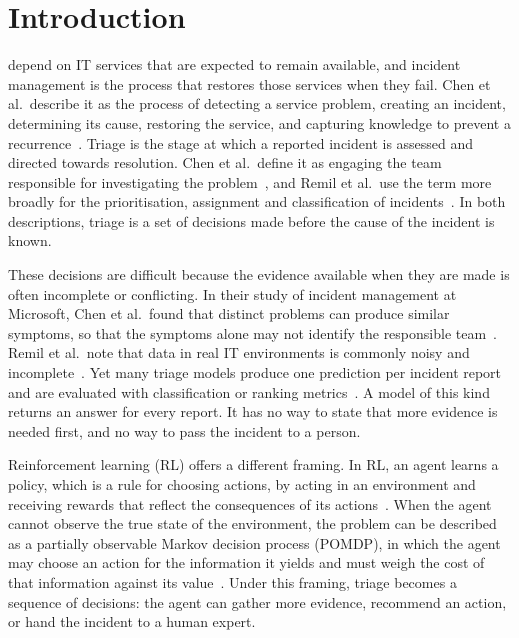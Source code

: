 \documentclass[journal]{IEEEtran}
\begin{document}
\section{Introduction}

 depend on IT services that are expected to remain available, and incident management is the process that restores those services when they fail. Chen et al.\ describe it as the process of detecting a service problem, creating an incident, determining its cause, restoring the service, and capturing knowledge to prevent a recurrence~\cite{chen2020}. Triage is the stage at which a reported incident is assessed and directed towards resolution. Chen et al.\ define it as engaging the team responsible for investigating the problem~\cite{chen2020}, and Remil et al.\ use the term more broadly for the prioritisation, assignment and classification of incidents~\cite{remil2024}. In both descriptions, triage is a set of decisions made before the cause of the incident is known.

These decisions are difficult because the evidence available when they are made is often incomplete or conflicting. In their study of incident management at Microsoft, Chen et al.\ found that distinct problems can produce similar symptoms, so that the symptoms alone may not identify the responsible team~\cite{chen2020}. Remil et al.\ note that data in real IT environments is commonly noisy and incomplete~\cite{remil2024}. Yet many triage models produce one prediction per incident report and are evaluated with classification or ranking metrics~\cite{remil2024}. A model of this kind returns an answer for every report. It has no way to state that more evidence is needed first, and no way to pass the incident to a person.

Reinforcement learning (RL) offers a different framing. In RL, an agent learns a policy, which is a rule for choosing actions, by acting in an environment and receiving rewards that reflect the consequences of its actions~\cite{sutton2018}. When the agent cannot observe the true state of the environment, the problem can be described as a partially observable Markov decision process (POMDP), in which the agent may choose an action for the information it yields and must weigh the cost of that information against its value~\cite{kaelbling1998}. Under this framing, triage becomes a sequence of decisions: the agent can gather more evidence, recommend an action, or hand the incident to a human expert.
\end{document}
